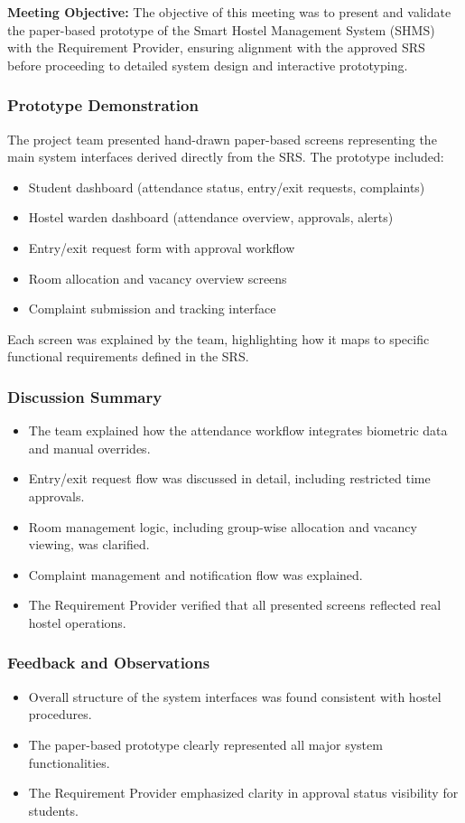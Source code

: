 \documentclass[12pt]{article}
\begin{document}
\textbf{Meeting Objective:}  
The objective of this meeting was to present and validate the paper-based prototype of the Smart Hostel Management System (SHMS) with the Requirement Provider, ensuring alignment with the approved SRS before proceeding to detailed system design and interactive prototyping.

\subsubsection{Prototype Demonstration}
The project team presented hand-drawn paper-based screens representing the main system interfaces derived directly from the SRS. The prototype included:

\begin{itemize}
\item Student dashboard (attendance status, entry/exit requests, complaints)
\item Hostel warden dashboard (attendance overview, approvals, alerts)
\item Entry/exit request form with approval workflow
\item Room allocation and vacancy overview screens
\item Complaint submission and tracking interface
\end{itemize}

Each screen was explained by the team, highlighting how it maps to specific functional requirements defined in the SRS.

\subsubsection{Discussion Summary}
\begin{itemize}
\item The team explained how the attendance workflow integrates biometric data and manual overrides.
\item Entry/exit request flow was discussed in detail, including restricted time approvals.
\item Room management logic, including group-wise allocation and vacancy viewing, was clarified.
\item Complaint management and notification flow was explained.
\item The Requirement Provider verified that all presented screens reflected real hostel operations.
\end{itemize}

\subsubsection{Feedback and Observations}
\begin{itemize}
\item Overall structure of the system interfaces was found consistent with hostel procedures.
\item The paper-based prototype clearly represented all major system functionalities.
\item The Requirement Provider emphasized clarity in approval status visibility for students.
\end{itemize}
\end{document}
